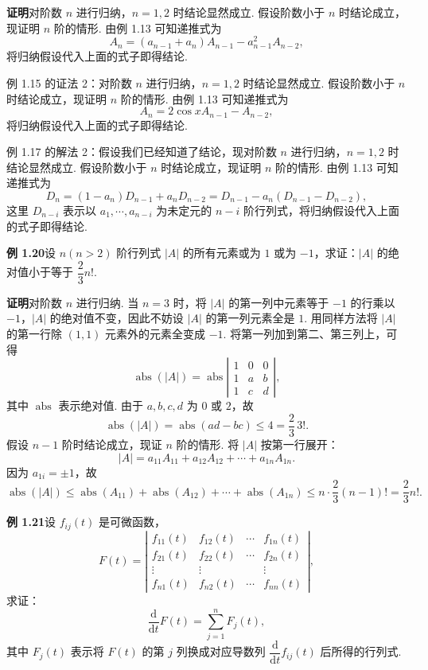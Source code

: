 \documentclass[UTF8, 12pt, fontset=fandol, oneside]{ctexart}
\begin{document}
\noindent\textbf{证明}\quad 对阶数 $n$ 进行归纳，$n=1,2$ 时结论显然成立. 假设阶数小于 $n$ 时结论成立，现证明 $n$ 阶的情形. 由例 1.13 可知递推式为
\[
A_n=(a_{n-1}+a_n)A_{n-1}-a_{n-1}^2A_{n-2},
\]
将归纳假设代入上面的式子即得结论.

例 1.15 的证法 2：对阶数 $n$ 进行归纳，$n=1,2$ 时结论显然成立. 假设阶数小于 $n$ 时结论成立，现证明 $n$ 阶的情形. 由例 1.13 可知递推式为
\[
A_n=2\cos xA_{n-1}-A_{n-2},
\]
将归纳假设代入上面的式子即得结论.

例 1.17 的解法 2：假设我们已经知道了结论，现对阶数 $n$ 进行归纳，$n=1,2$ 时结论显然成立. 假设阶数小于 $n$ 时结论成立，现证明 $n$ 阶的情形. 由例 1.13 可知递推式为
\[
D_n=(1-a_n)D_{n-1}+a_nD_{n-2}=D_{n-1}-a_n(D_{n-1}-D_{n-2}),
\]
这里 $D_{n-i}$ 表示以 $a_1,\cdots,a_{n-i}$ 为未定元的 $n-i$ 阶行列式，将归纳假设代入上面的式子即得结论.

\noindent\textbf{例 1.20}\quad 设 $n(n>2)$ 阶行列式 $|A|$ 的所有元素或为 $1$ 或为 $-1$，求证：$|A|$ 的绝对值小于等于 $\dfrac23n!$.

\noindent\textbf{证明}\quad 对阶数 $n$ 进行归纳. 当 $n=3$ 时，将 $|A|$ 的第一列中元素等于 $-1$ 的行乘以 $-1$，$|A|$ 的绝对值不变，因此不妨设 $|A|$ 的第一列元素全是 $1$. 用同样方法将 $|A|$ 的第一行除 $(1,1)$ 元素外的元素全变成 $-1$. 将第一列加到第二、第三列上，可得
\[
\operatorname{abs}(|A|)
=\operatorname{abs}\left|\begin{array}{ccc}
1 & 0 & 0\\
1 & a & b\\
1 & c & d
\end{array}\right|,
\]
其中 $\operatorname{abs}$ 表示绝对值. 由于 $a,b,c,d$ 为 $0$ 或 $2$，故
\[
\operatorname{abs}(|A|)=\operatorname{abs}(ad-bc)\le4=\frac23\,3!.
\]
假设 $n-1$ 阶时结论成立，现证 $n$ 阶的情形. 将 $|A|$ 按第一行展开：
\[
|A|=a_{11}A_{11}+a_{12}A_{12}+\cdots+a_{1n}A_{1n}.
\]
因为 $a_{1i}=\pm1$，故
\[
\operatorname{abs}(|A|)
\le \operatorname{abs}(A_{11})+\operatorname{abs}(A_{12})+\cdots+\operatorname{abs}(A_{1n})
\le n\cdot\frac23(n-1)!=\frac23n!.
\]

\noindent\textbf{例 1.21}\quad 设 $f_{ij}(t)$ 是可微函数，
\[
F(t)=\left|\begin{array}{cccc}
f_{11}(t) & f_{12}(t) & \cdots & f_{1n}(t)\\
f_{21}(t) & f_{22}(t) & \cdots & f_{2n}(t)\\
\vdots & \vdots &        & \vdots\\
f_{n1}(t) & f_{n2}(t) & \cdots & f_{nn}(t)
\end{array}\right|,
\]
求证：
\[
\frac{\mathrm{d}}{\mathrm{d}t}F(t)=\sum_{j=1}^nF_j(t),
\]
其中 $F_j(t)$ 表示将 $F(t)$ 的第 $j$ 列换成对应导数列 $\dfrac{\mathrm{d}}{\mathrm{d}t}f_{ij}(t)$ 后所得的行列式.
\end{document}
